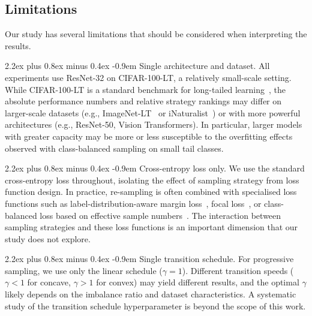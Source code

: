 \documentclass[12pt,a4paper]{article}
\makeatletter
\renewcommand{\paragraph}{\@startsection{paragraph}{4}{\z@}%
  {2.2ex plus 0.8ex minus 0.4ex}%
  {-0.9em}%
  {\normalfont\normalsize\bfseries}}
\makeatother
\begin{document}


\subsection{Limitations}

Our study has several limitations that should be considered when interpreting the results.

\paragraph{Single architecture and dataset.} All experiments use ResNet-32 on CIFAR-100-LT, a relatively small-scale setting. While CIFAR-100-LT is a standard benchmark for long-tailed learning~\citep{cao2019learning, zhang2023deep}, the absolute performance numbers and relative strategy rankings may differ on larger-scale datasets (e.g., ImageNet-LT~\citep{liu2019large} or iNaturalist~\citep{van2018inaturalist}) or with more powerful architectures (e.g., ResNet-50, Vision Transformers). In particular, larger models with greater capacity may be more or less susceptible to the overfitting effects observed with class-balanced sampling on small tail classes.

\paragraph{Cross-entropy loss only.} We use the standard cross-entropy loss throughout, isolating the effect of sampling strategy from loss function design. In practice, re-sampling is often combined with specialised loss functions such as label-distribution-aware margin loss~\citep{cao2019learning}, focal loss~\citep{lin2017focal}, or class-balanced loss based on effective sample numbers~\citep{cui2019class}. The interaction between sampling strategies and these loss functions is an important dimension that our study does not explore.

\paragraph{Single transition schedule.} For progressive sampling, we use only the linear schedule ($\gamma = 1$). Different transition speeds ($\gamma < 1$ for concave, $\gamma > 1$ for convex) may yield different results, and the optimal $\gamma$ likely depends on the imbalance ratio and dataset characteristics. A systematic study of the transition schedule hyperparameter is beyond the scope of this work.
\end{document}
